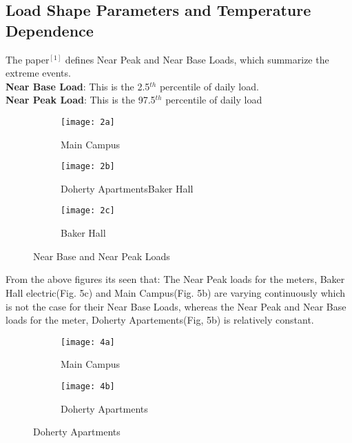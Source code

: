 \documentclass[a4paper,11pt]{article}
\begin{document}
\begin{itemize}
\section{Load Shape Parameters and Temperature Dependence}
The paper$^{[1]}$ defines Near Peak and Near Base Loads, which summarize the extreme events.\\
\textbf{Near Base Load}: This is the 2.5$^{th}$ percentile of daily load.\\
\textbf{Near Peak Load}: This is the 97.5$^{th}$ percentile of daily load
\begin{figure}[H]
        \centering
        \begin{subfigure}[b]{0.3\textwidth}
                \texttt{[image: 2a]}
                \caption{Main Campus}
                \label{fig:Load 1}
        \end{subfigure}%
\hfill
        \begin{subfigure}[b]{0.3\textwidth}
                \texttt{[image: 2b]}
                \caption{Doherty ApartmentsBaker Hall}
                \label{fig:tiger}
        \end{subfigure}
 \hfill       
        \begin{subfigure}[b]{0.35\textwidth}
                \texttt{[image: 2c]}
                \caption{Baker Hall}
                \label{fig:tiger}
        \end{subfigure}
        \caption{Near Base and Near Peak Loads}\label{fig:animals}
\end{figure}
\noindent From the above figures its seen that:
The Near Peak loads for the meters, Baker Hall electric(Fig. 5c) and Main Campus(Fig. 5b) are varying continuously which is not the case for their Near Base Loads, whereas the Near Peak and Near Base loads for the meter, Doherty Apartements(Fig, 5b) is relatively constant.
\begin{figure}[H]
        \centering
        \begin{subfigure}[b]{0.25\textwidth}
                \texttt{[image: 4a]}
                \caption{Main Campus}
                \label{fig:Load 1}
        \end{subfigure}%
\hspace{-10pt}
        \begin{subfigure}[b]{0.25\textwidth}
                \texttt{[image: 4b]}
                \caption{Doherty Apartments}
                \label{fig:tiger}
        \end{subfigure}

\end{figure}
\end{itemize}
\end{document}
